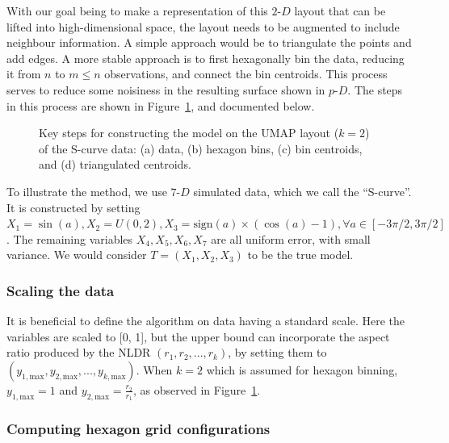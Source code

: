 \documentclass[
  12pt]{article}
\newcommand\pD{$p\text{-}D$}
\newcommand\gD{$2\text{-}D$}
\begin{document}
With our goal being to make a representation of this \gD{} layout that
can be lifted into high-dimensional space, the layout needs to be
augmented to include neighbour information. A simple approach would be
to triangulate the points and add edges. A more stable approach is to
first hexagonally bin the data, reducing it from \(n\) to \(m\leq n\)
observations, and connect the bin centroids. This process serves to
reduce some noisiness in the resulting surface shown in \pD{}. The steps
in this process are shown in Figure~\ref{fig-NLDR-scurve}, and
documented below.

\begin{figure}


\caption{\label{fig-NLDR-scurve}Key steps for constructing the model on
the UMAP layout (\(k=2\)) of the S-curve data: (a) data, (b) hexagon
bins, (c) bin centroids, and (d) triangulated centroids.}

\end{figure}%

To illustrate the method, we use \(7\text{-}D\) simulated data, which we
call the ``S-curve''. It is constructed by setting
\(X_1 = \sin(a), X_2 = U(0, 2), X_3 = \text{sign}(a) \times (\cos(a) - 1), \forall a \in [-3\pi/2, 3\pi/2]\).
The remaining variables \(X_4, X_5, X_6, X_7\) are all uniform error,
with small variance. We would consider \(T=(X_1, X_2, X_3)\) to be the
true model.

\subsubsection{Scaling the data}\label{scaling-the-data}

It is beneficial to define the algorithm on data having a standard
scale. Here the variables are scaled to {[}0, 1{]}, but the upper bound
can incorporate the aspect ratio produced by the NLDR
\((r_1, r_2, ..., r_k)\), by setting them to
\((y_{1,\text{max}}, y_{2,\text{max}}, ..., y_{k,\text{max}})\). When
\(k=2\) which is assumed for hexagon binning, \(y_{1,\text{max}}=1\) and
\(y_{2,\text{max}} = \frac{r_2}{r_1}\), as observed in
Figure~\ref{fig-NLDR-scurve}.

\subsubsection{Computing hexagon grid
configurations}\label{computing-hexagon-grid-configurations}
\end{document}
